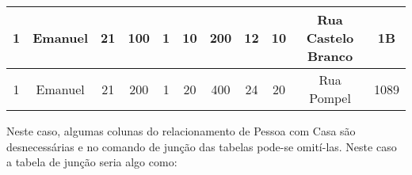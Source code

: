 \begin{table}[h]
{\begin{tabular}{|c|c|c|c|c|c|c|c|c|c|c|}
                1                                                                    & Emanuel & 21    & 100                                                                                                    & 1                                                                                                & 10                                                                                             & 200                                                    & 12                                                            & 10                                                                 & Rua Castelo Branco & 1B     \\ \hline
                1                                                                    & Emanuel & 21    & 200                                                                                                    & 1                                                                                                & 20                                                                                             & 400                                                    & 24                                                             & 20                                                                 & Rua Pompel & 1089     \\ \hline
            \end{tabular}%
        }
    \end{table}
    
Neste caso, algumas colunas do relacionamento de Pessoa com Casa são desnecessárias e no comando de junção das tabelas pode-se omití-las. Neste caso a tabela de junção seria algo como:
    
